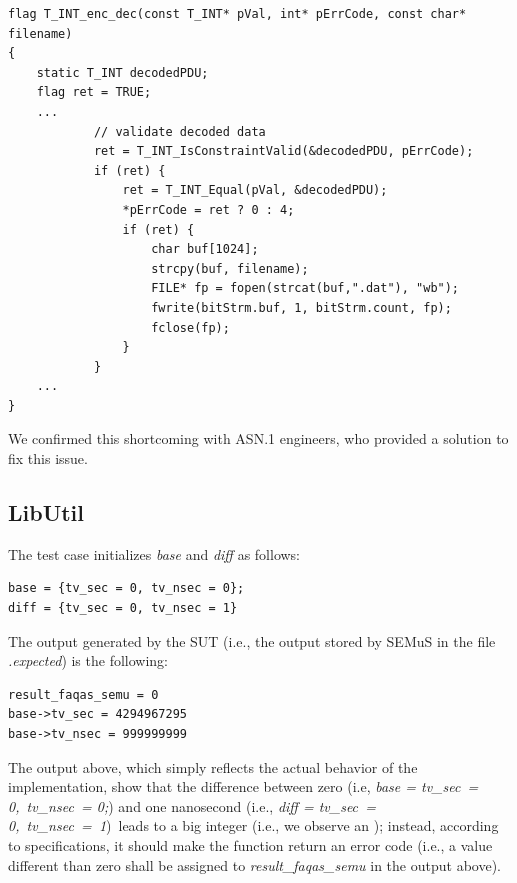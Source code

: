 \begin{lstlisting}[style=CStyle, caption=ASN.1 test code., label=test_code]
flag T_INT_enc_dec(const T_INT* pVal, int* pErrCode, const char* filename)
{
    static T_INT decodedPDU;
    flag ret = TRUE;
    ...
            // validate decoded data
            ret = T_INT_IsConstraintValid(&decodedPDU, pErrCode);
            if (ret) {
                ret = T_INT_Equal(pVal, &decodedPDU);
                *pErrCode = ret ? 0 : 4;
                if (ret) {
                    char buf[1024];
                    strcpy(buf, filename);
                    FILE* fp = fopen(strcat(buf,".dat"), "wb");
                    fwrite(bitStrm.buf, 1, bitStrm.count, fp);
                    fclose(fp);
                }
            }
    ...
}
\end{lstlisting}

We confirmed this shortcoming with ASN.1 engineers, who provided a solution to fix this issue.

\subsection{LibUtil}




\STARTCHANGEDFINAL

The test case initializes \emph{base} and \emph{diff} as follows:
\begin{verbatim}
base = {tv_sec = 0, tv_nsec = 0};
diff = {tv_sec = 0, tv_nsec = 1} 
\end{verbatim}

The output generated by the SUT (i.e., the output stored by SEMuS in the file \emph{.expected}) is the following:
\begin{verbatim}
result_faqas_semu = 0
base->tv_sec = 4294967295
base->tv_nsec = 999999999
\end{verbatim}

The output above, which simply reflects the actual behavior of the implementation, show that the difference between zero (i.e, \emph{base = {tv\_sec = 0, tv\_nsec = 0};}) and one nanosecond  (i.e., \emph{diff = {tv\_sec = 0, tv\_nsec = 1}}) leads to a big integer (i.e., we observe an ); instead, according to specifications, it should make the function return an error code (i.e., a value different than zero shall be assigned to \emph{result\_faqas\_semu} in the output above).


